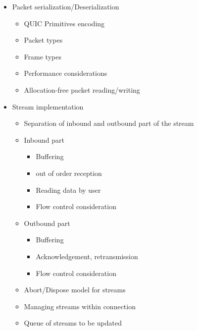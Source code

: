 \begin{itemize}
\begin{itemize}
\begin{itemize}
        \end{itemize}
    \end{itemize}

    \item Packet serialization/Deserialization
    \begin{itemize}

        \item QUIC Primitives encoding
        \item Packet types
        \item Frame types
        \item Performance considerations
        \item Allocation-free packet reading/writing

    \end{itemize}

    \item Stream implementation
    \begin{itemize}

        \item Separation of inbound and outbound part of the stream
        \item Inbound part

        \begin{itemize}

            \item Buffering
            \item out of order reception
            \item Reading data by user
            \item Flow control consideration

        \end{itemize}

        \item Outbound part
        \begin{itemize}

            \item Buffering
            \item Acknowledgement, retransmission
            \item Flow control consideration
        \end{itemize}

        \item Abort/Dispose model for streams
        \item Managing streams within connection
        \item Queue of streams to be updated


\end{itemize}
\end{itemize}
